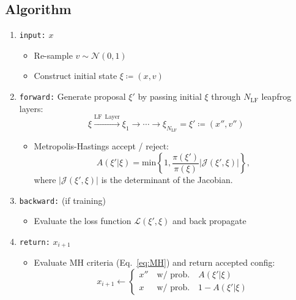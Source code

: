 \documentclass[a4paper,11pt]{article}
\begin{document}
\subsection{\label{subsec:algorithm}Algorithm}
\begin{enumerate}
    \item \texttt{input:} $x$
    \begin{itemize}
        \item Re-sample $v \sim \mathcal{N}(0, 1)$
        \item Construct initial state $\xi \coloneqq (x, v)$
    \end{itemize}
    \item \texttt{forward:} Generate proposal $\xi'$ by passing initial $\xi$
      through $N_{\mathrm{LF}}$ leapfrog layers:
    \begin{equation}
        \xi \xrightarrow[]{\mathrm{LF\,\,\, Layer}} \xi_{1} \rightarrow \cdots \rightarrow \xi_{N_{\mathrm{LF}}} = \xi' \coloneqq (x'', v'')
    \end{equation}
    \begin{itemize}
        \item Metropolis-Hastings accept / reject:
        \begin{equation}
            A(\xi'|\xi) = \mathrm{min}\left\{1, \frac{\pi(\xi')}{\pi(\xi)} \left|\mathcal{J}\left(\xi', \xi\right)\right|\right\},
            \label{eq:MH}
        \end{equation}
        where $\left|\mathcal{J}(\xi',\xi)\right|$ is the determinant of the
        Jacobian.
    \end{itemize}
    \item \texttt{backward:} (if training)
    \begin{itemize}
        \item Evaluate the loss function $\mathcal{L}(\xi', \xi)$ and back
          propagate
    \end{itemize}
    \item \texttt{return:} $x_{i+1}$
    \begin{itemize}
        \item Evaluate MH criteria (Eq.~\ref{eq:MH}) and return accepted
          config:
        \begin{equation}
            x_{i+1} \gets \begin{cases}
                x'' \quad \text{w/ prob.}\quad A(\xi'|\xi)  \\
                x \,\,\,\quad \text{w/ prob.} \quad 1 - A(\xi'|\xi)
            \end{cases}
        \end{equation}
    \end{itemize}
\end{enumerate}
%
\end{document}
